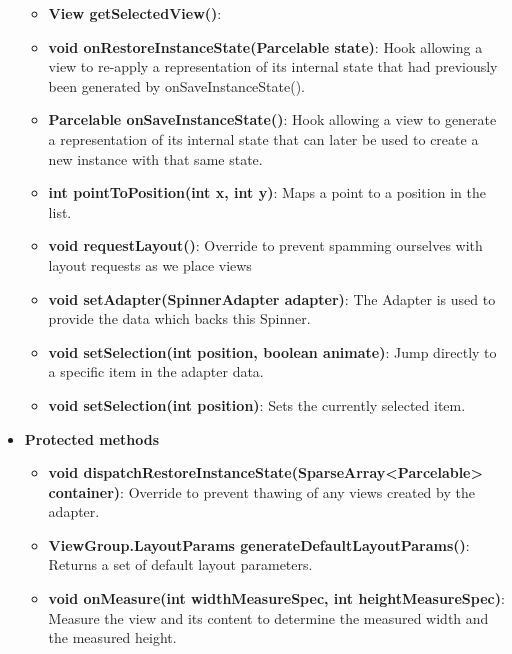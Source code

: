 \documentclass{report}
\begin{document}
\begin{itemize}
\begin{itemize}
                \item \textbf{View	getSelectedView()}:
                \item \textbf{void	onRestoreInstanceState(Parcelable state)}: Hook allowing a view to re-apply a representation of its internal state that had previously been generated by onSaveInstanceState().
                \item \textbf{Parcelable	onSaveInstanceState()}: Hook allowing a view to generate a representation of its internal state that can later be used to create a new instance with that same state.
                \item \textbf{int	pointToPosition(int x, int y)}: Maps a point to a position in the list.
                \item \textbf{void	requestLayout()}: Override to prevent spamming ourselves with layout requests as we place views
                \item \textbf{void	setAdapter(SpinnerAdapter adapter)}: The Adapter is used to provide the data which backs this Spinner.
                \item \textbf{void	setSelection(int position, boolean animate)}: Jump directly to a specific item in the adapter data.
                \item \textbf{void	setSelection(int position)}: Sets the currently selected item.
            \end{itemize}
        \item \textbf{Protected methods}
            \begin{itemize}
                \item \textbf{void	dispatchRestoreInstanceState(SparseArray<Parcelable> container)}: Override to prevent thawing of any views created by the adapter.
                \item \textbf{ViewGroup.LayoutParams	generateDefaultLayoutParams()}: Returns a set of default layout parameters.
                \item \textbf{void	onMeasure(int widthMeasureSpec, int heightMeasureSpec)}: Measure the view and its content to determine the measured width and the measured height.
            \end{itemize}
    \end{itemize}

    \pagebreak 
\end{document}
